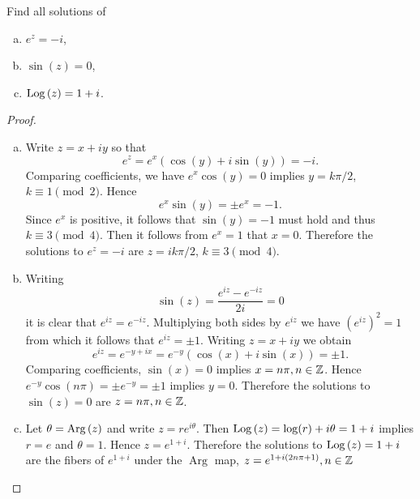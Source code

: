 \documentclass[12pt]{amsart}
\begin{document}
\begin{thm}
  Find all solutions of 
  \begin{enumerate}[(a)]
  \item
    $e^z = -i$,
  \item
    $\sin(z) = 0$,
  \item
    $\operatorname{Log}\left(z\right) = 1 + i$.
  \end{enumerate}
  
  \begin{proof}
    \begin{enumerate}[(a)]
    \item
      Write $z = x + iy$ so that $$e^z = e^x(\cos(y) + i\sin(y)) = -i.$$
      Comparing coefficients, we have $e^x\cos(y) = 0$ implies $y = k\pi/2$, $k \equiv 1 \pmod{2}$.
      Hence $$e^x\sin(y) = \pm e^x = -1.$$
      Since $e^x$ is positive, it follows that $\sin(y) = -1$ must hold and thus $k \equiv 3 \pmod{4}$. 
      Then it follows from $e^x = 1$ that $x = 0$.
      Therefore the solutions to $e^z = -i$ are $z = ik\pi/2$, $k \equiv 3 \pmod{4}$.
    \item
      Writing $$\sin(z) = \frac{e^{iz} - e^{-iz}}{2i} = 0$$
      it is clear that $e^{iz} = e^{-iz}$.
      Multiplying both sides by $e^{iz}$ we have $(e^{iz})^2 = 1$ from which it follows that $e^{iz} = \pm 1$.
      Writing $z = x + iy$ we obtain $$e^{iz} = e^{-y + ix} = e^{-y}(\cos(x) + i\sin(x)) = \pm 1.$$
      Comparing coefficients, $\sin(x) = 0$ implies $x = n\pi, n \in \mathbb{Z}$.
      Hence $e^{-y}\cos(n\pi) = \pm e^{-y} = \pm {1}$ implies $y = 0$.
      Therefore the solutions to $\sin(z) = 0$ are $z = n\pi, n \in \mathbb{Z}$.
    \item
      Let $\theta = \operatorname{Arg}\left(z\right)$ and write $z = re^{i\theta}$.
      Then $\operatorname{Log}\left(z\right) = \log(r) + i\theta = 1 + i$ implies $r = e$ and $\theta = 1$.
      Hence $z = e^{1 + i}$.
      Therefore the solutions to $\operatorname{Log}\left(z\right) = 1 + i$ are the fibers of $e^{1 + i}$ under the $\operatorname{Arg}$ map, $z = e^{1 + i(2n\pi + 1)}, n \in \mathbb{Z}$
    \end{enumerate}
  \end{proof}
\end{thm}
\end{document}
